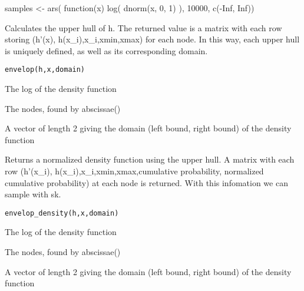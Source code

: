 \documentclass[a4paper]{book}
\begin{document}
%
\begin{Examples}
\begin{ExampleCode}
samples <- ars( function(x) log( dnorm(x, 0, 1) ), 10000, c(-Inf, Inf))
\end{ExampleCode}
\end{Examples}
%
\begin{Description}\relax
Calculates the upper hull of h. The returned value is a matrix with each row storing (h'(x), h(x\_i),x\_i,xmin,xmax) for each node. In this way, each upper hull is uniquely defined, as well as its corresponding domain.
\end{Description}
%
\begin{Usage}
\begin{verbatim}
envelop(h,x,domain)
\end{verbatim}
\end{Usage}
%
\begin{Arguments}
\begin{ldescription}
\item[\code{h}] The log of the density function

\item[\code{x}] The nodes, found by abscissae()

\item[\code{domain}] A vector of length 2 giving the domain (left bound, right bound) of the density function
\end{ldescription}
\end{Arguments}
%
\begin{Description}\relax
Returns a normalized density function using the upper hull. A matrix with each row (h'(x\_i), h(x\_i),x\_i,xmin,xmax,cumulative probability, normalized cumulative probability) at each node is returned. With this infomation we can sample with sk.
\end{Description}
%
\begin{Usage}
\begin{verbatim}
envelop_density(h,x,domain)
\end{verbatim}
\end{Usage}
%
\begin{Arguments}
\begin{ldescription}
\item[\code{h}] The log of the density function

\item[\code{x}] The nodes, found by abscissae()

\item[\code{domain}] A vector of length 2 giving the domain (left bound, right bound) of the density function
\end{ldescription}
\end{Arguments}
\end{document}
